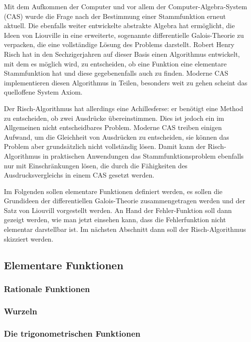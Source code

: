 Mit dem Aufkommen der Computer und vor allem der Computer-Algebra-System (CAS)
wurde die Frage nach der Bestimmung einer Stammfunktion erneut aktuell.
Die ebenfalls weiter entwickelte abstrakte Algebra hat ermöglicht, die
Ideen von Liouville in eine erweiterte, sogenannte differentielle 
Galois-Theorie zu verpacken, die eine vollständige Lösung des Problems
darstellt.
Robert Henry Risch hat in den Sechzigerjahren auf dieser Basis
einen Algorithmus entwickelt, mit dem es möglich wird, zu entscheiden,
ob eine Funktion eine elementare Stammfunktion hat und diese
gegebenenfalls auch zu finden.
Moderne CAS implementieren diesen Algorithmus
in Teilen, besonders weit zu gehen scheint das quelloffene System
Axiom.

Der Risch-Algorithmus hat allerdings eine Achillesferse: er benötigt
eine Method zu entscheiden, ob zwei Ausdrücke übereinstimmen.
Dies ist jedoch ein im Allgemeinen nicht entscheidbares Problem.
Moderne CAS treiben einigen Aufwand, um die
Gleichheit von Ausdrücken zu entscheiden, sie können das Problem
aber grundsätzlich nicht vollständig lösen.
Damit kann der Risch-Algorithmus in praktischen Anwendungen das
Stammfunktionsproblem ebenfalls nur mit Einschränkungen lösen,
die durch die Fähigkeiten des Ausdrucksvergleichs in einem CAS
gesetzt werden.

Im Folgenden sollen elementare Funktionen definiert werden, es sollen
die Grundideen der differentiellen Galois-Theorie zusammengetragen werden
und der Satz von Liouvill vorgestellt werden.
An Hand der Fehler-Funktion soll dann gezeigt werden, wie man jetzt
einsehen kann, dass die Fehlerfunktion nicht elementar darstellbar ist.
Im nächsten Abschnitt dann soll der Risch-Algorithmus skizziert werden.

\subsection{Elementare Funktionen
\label{buch:integrale:section:elementar}}


\subsubsection{Rationale Funktionen}

\subsubsection{Wurzeln}

\subsubsection{Die trigonometrischen Funktionen}

